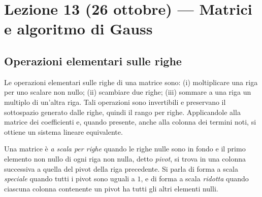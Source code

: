 \documentclass[11pt,a4paper]{article}
\theoremstyle{plain}
\theoremstyle{definition}
\theoremstyle{remark}
\begin{document}
\section{Lezione 13 (26 ottobre) --- Matrici e algoritmo di Gauss}

\subsection{Operazioni elementari sulle righe}
Le operazioni elementari sulle righe di una matrice sono: (i) moltiplicare una riga per uno scalare non nullo; (ii) scambiare due righe; (iii) sommare a una riga un multiplo di un'altra riga. Tali operazioni sono invertibili e preservano il sottospazio generato dalle righe, quindi il rango per righe. Applicandole alla matrice dei coefficienti e, quando presente, anche alla colonna dei termini noti, si ottiene un sistema lineare equivalente.

Una matrice è \emph{a scala per righe} quando le righe nulle sono in fondo e il primo elemento non nullo di ogni riga non nulla, detto \emph{pivot}, si trova in una colonna successiva a quella del pivot della riga precedente. Si parla di forma a scala \emph{speciale} quando tutti i pivot sono uguali a $1$, e di forma a scala \emph{ridotta} quando ciascuna colonna contenente un pivot ha tutti gli altri elementi nulli.
\end{document}
